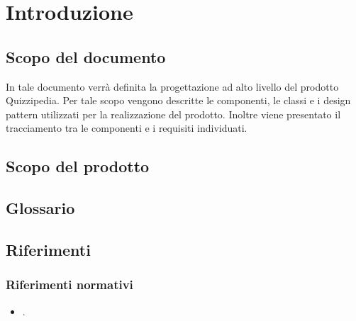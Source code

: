 \documentclass[a4paper, titlepage]{article}
\begin{document}
\pagestyle{fancy}	

\maketitle



\newpage
\tableofcontents

\newpage
\listoffigures \label{lastromanpage}

\newpage
\clearpage	
{}
\hypersetup{linkcolor=blue}

\section{Introduzione}
\subsection{Scopo del documento}
In tale documento verrà definita la progettazione ad alto livello del prodotto Quizzipedia.
Per tale scopo vengono descritte le componenti, le classi e i design pattern utilizzati per la realizzazione del prodotto. Inoltre viene presentato il tracciamento tra le componenti e i requisiti individuati.

\subsection{Scopo del prodotto}
\SCOPO

\subsection{Glossario}
\GLOSSARIO

\subsection{Riferimenti}
\subsubsection{Riferimenti normativi}
\begin{itemize}
\item {} \NdPdoc.
\end{itemize}
\end{document}
